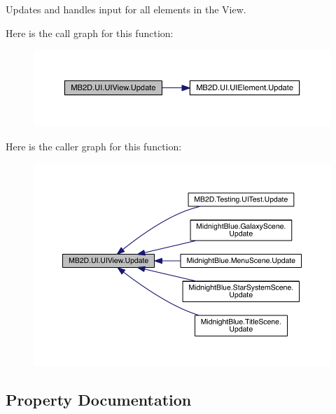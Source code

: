 Updates and handles input for all elements in the View. 

Here is the call graph for this function\+:
\nopagebreak
\begin{figure}[H]
\begin{center}
\leavevmode
\includegraphics[width=350pt]{class_m_b2_d_1_1_u_i_1_1_u_i_view_a5628b6cd853a0f419eb8ac62958f62bb_cgraph}
\end{center}
\end{figure}
Here is the caller graph for this function\+:
\nopagebreak
\begin{figure}[H]
\begin{center}
\leavevmode
\includegraphics[width=350pt]{class_m_b2_d_1_1_u_i_1_1_u_i_view_a5628b6cd853a0f419eb8ac62958f62bb_icgraph}
\end{center}
\end{figure}


\subsection{Property Documentation}
\hypertarget{class_m_b2_d_1_1_u_i_1_1_u_i_view_a9d5bf0c4239df5a79429921bda80a1ad}{}\label{class_m_b2_d_1_1_u_i_1_1_u_i_view_a9d5bf0c4239df5a79429921bda80a1ad} 
